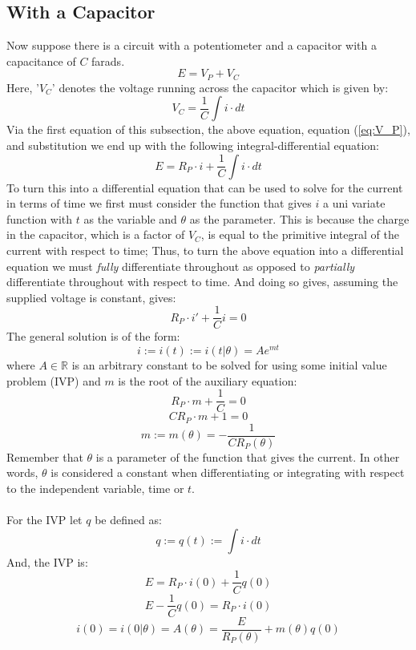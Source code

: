 \documentclass{article}
\begin{document}
	\subsection[Capacitor]{With a Capacitor}
	Now suppose there is a circuit with a potentiometer and a capacitor with a 
	capacitance of $C$ farads.
	$$ E = V_P + V_C$$
	Here, '$V_C$' denotes the voltage running across the capacitor which is 
	given by:
	\begin{equation}\label{eq:V_C}
		V_C = \frac{1}{C} \int i \cdot dt
	\end{equation}
	Via the first equation of this subsection, the above equation, equation 
	(\ref{eq:V_P}), and substitution we end up with the following 
	integral-differential equation:
	$$ E = R_P \cdot i + \frac{1}{C} \int i \cdot dt$$
	To turn this into a differential equation that can be used to solve for the 
	current in terms of time we first must consider the function that gives $i$ 
	a uni variate function with $t$ as the variable and $\theta$ as the 
	parameter.  This is because the charge in the capacitor, which is a factor 
	of $V_C$, is equal to the primitive integral of the current with respect to 
	time;  Thus, to turn the above equation into a differential equation we 
	must \emph{fully} differentiate throughout as opposed to \emph{partially} 
	differentiate throughout with respect to time.  And doing so gives, 
	assuming the supplied voltage is constant, gives:
	$$ R_P \cdot i' + \frac{1}{C} i = 0$$
	The general solution is of the form:
	$$ i := i(t) := i(t \vert \theta) = Ae^{mt}$$
	where $A \in \mathbb{R}$ is an arbitrary constant to be solved for using 
	some initial value problem (IVP) and $m$ is the root of the auxiliary 
	equation:
	$$ R_P \cdot m + \frac{1}{C} = 0$$
	$$ CR_P \cdot m + 1 = 0$$
	$$ m := m(\theta) = - \frac{1}{CR_P(\theta)}$$
	Remember that $\theta$ is a parameter of the function that gives the 
	current.  In other words, $\theta$ is considered a constant when 
	differentiating or integrating with respect to the independent variable, 
	time or $t$. \\ \\
	For the IVP let $q$ be defined as:
	$$ q:=q(t) := \int i \cdot dt$$
	And, the IVP is:
	$$ E = R_P \cdot i(0) + \frac{1}{C} q(0)$$
	$$ E - \frac{1}{C}q(0) = R_P \cdot i(0) $$
	$$ i(0) = i(0 \vert \theta) = A(\theta) = \frac{E}{R_P(\theta)} + 
	m(\theta)q(0)$$
\end{document}
